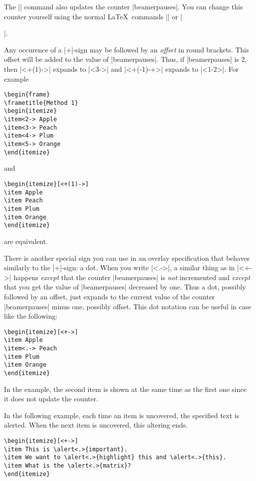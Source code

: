 The |\pause| command also updates the counter |beamerpauses|. You can change this counter yourself using the normal \LaTeX\ commands |\setcounter| or |\addtocounter|.

Any occurence of a |+|-sign may be followed by an
\emph{offset} in round brackets. This offset will
be added to the value of |beamerpauses|. Thus, if
|beamerpauses| is 2, then |<+(1)->| expands to
|<3->| and |<+(-1)-+>| expands to |<1-2>|. For example
\begin{verbatim}
\begin{frame}
\frametitle{Method 1}
\begin{itemize}
\item<2-> Apple
\item<3-> Peach
\item<4-> Plum
\item<5-> Orange
\end{itemize}
\end{verbatim}
and
\begin{verbatim}
\begin{itemize}[<+(1)->]
\item Apple
\item Peach
\item Plum
\item Orange
\end{itemize}
\end{verbatim}
are equivalent.

There is another special sign you can use in an overlay specification that behaves similarly to the |+|-sign: a dot. When you write |<.->|, a similar thing as in |<+->| happens \emph{except} that the counter |beamerpauses| is \emph{not} incremented and \emph{except} that you get the value of |beamerpauses| decreased by one. Thus a dot, possibly followed by an offset, just expands to the current value of the counter |beamerpauses| minus one, possibly offset. This dot notation can be useful in case like the following:
\begin{verbatim}
\begin{itemize}[<+->]
\item Apple
\item<.-> Peach
\item Plum
\item Orange
\end{itemize}
\end{verbatim}

In the example, the second item is shown at the same time as the first one since it does not update the counter.

In the following example, each time an item is uncovered, the specified text is alerted. When the next item is uncovered, this altering ends.
\begin{verbatim}
\begin{itemize}[<+->]
\item This is \alert<.>{important}.
\item We want to \alert<.>{highlight} this and \alert<.>{this}.
\item What is the \alert<.>{matrix}?
\end{itemize}
\end{verbatim}
